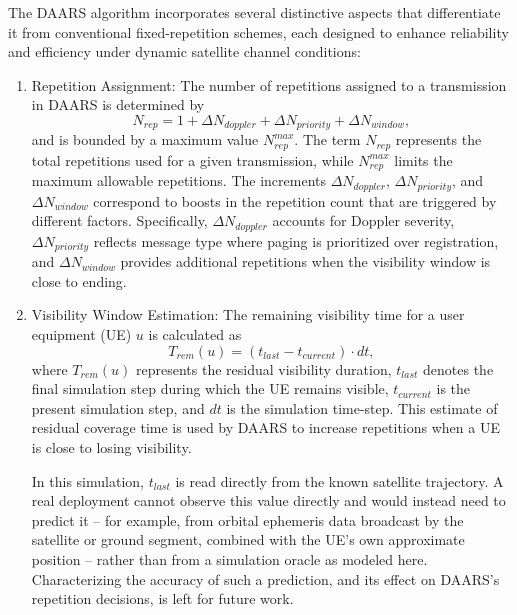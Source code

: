 \documentclass[conference]{IEEEtran}
\begin{document}
The DAARS algorithm incorporates several distinctive aspects that differentiate it from conventional fixed-repetition schemes, each designed to enhance reliability and efficiency under dynamic satellite channel conditions:

\begin{enumerate}
    \item[a)] Repetition Assignment: The number of repetitions assigned to a transmission in DAARS is determined by
\begin{equation}
N_{rep} = 1 + \Delta N_{doppler} + \Delta N_{priority} + \Delta N_{window},
\end{equation}
and is bounded by a maximum value $N_{rep}^{max}$. The term $N_{rep}$ represents the total repetitions used for a given transmission, while $N_{rep}^{max}$ limits the maximum allowable repetitions. The increments $\Delta N_{doppler}$, $\Delta N_{priority}$, and $\Delta N_{window}$ correspond to boosts in the repetition count that are triggered by different factors. Specifically, $\Delta N_{doppler}$ accounts for Doppler severity, $\Delta N_{priority}$ reflects message type where paging is prioritized over registration, and $\Delta N_{window}$ provides additional repetitions when the visibility window is close to ending.

    \item[b)] Visibility Window Estimation: The remaining visibility time for a user equipment (UE) $u$ is calculated as
\begin{equation}
T_{rem}(u) = (t_{last} - t_{current}) \cdot dt,
\end{equation}
where $T_{rem}(u)$ represents the residual visibility duration, $t_{last}$ denotes the final simulation step during which the UE remains visible, $t_{current}$ is the present simulation step, and $dt$ is the simulation time-step. This estimate of residual coverage time is used by DAARS to increase repetitions when a UE is close to losing visibility.

In this simulation, $t_{last}$ is read directly from the known satellite trajectory. A real deployment cannot observe this value directly and would instead need to predict it -- for example, from orbital ephemeris data broadcast by the satellite or ground segment, combined with the UE's own approximate position -- rather than from a simulation oracle as modeled here. Characterizing the accuracy of such a prediction, and its effect on DAARS's repetition decisions, is left for future work.

\end{enumerate}
\end{document}
